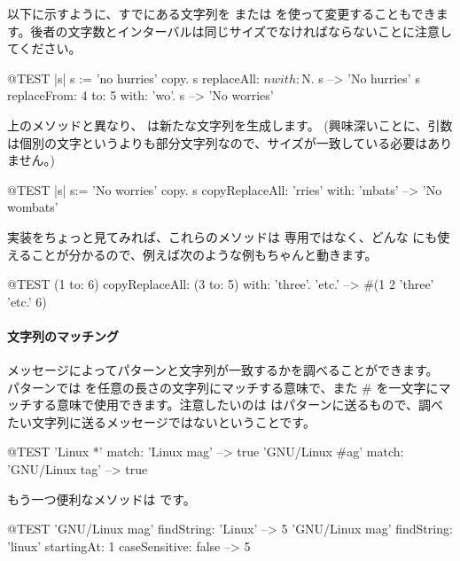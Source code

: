 \documentclass[a4paper,10pt,twoside]{book}
\begin{document}
以下に示すように、すでにある文字列を  または  を使って変更することもできます。後者の文字数とインターバルは同じサイズでなければならないことに注意してください。

\begin{code}{@TEST |s| s := 'no hurries' copy.}
s replaceAll: $n with: $N.
s --> 'No hurries'
s replaceFrom: 4 to: 5 with: 'wo'.
s --> 'No worries'
\end{code}

上のメソッドと異なり、 は新たな文字列を生成します。
(興味深いことに、引数は個別の文字というよりも部分文字列なので、サイズが一致している必要はありません。)

\begin{code}{@TEST |s| s:= 'No worries' copy.}
s copyReplaceAll: 'rries' with: 'mbats' --> 'No wombats'
\end{code}

実装をちょっと見てみれば、これらのメソッドは  専用ではなく、どんな  にも使えることが分かるので、例えば次のような例もちゃんと動きます。

\begin{code}{@TEST}
(1 to: 6) copyReplaceAll: (3 to: 5) with: { 'three'. 'etc.' } --> #(1 2 'three' 'etc.' 6)
\end{code}

\paragraph{文字列のマッチング}
 メッセージによってパターンと文字列が一致するかを調べることができます。
パターンでは \ct{*} を任意の長さの文字列にマッチする意味で、また \# を一文字にマッチする意味で使用できます。注意したいのは  はパターンに送るもので、調べたい文字列に送るメッセージではないということです。
\begin{code}{@TEST}
'Linux *' match: 'Linux mag'                      --> true
'GNU/Linux #ag' match: 'GNU/Linux tag' --> true
\end{code}

もう一つ便利なメソッドは  です。
\begin{code}{@TEST}
'GNU/Linux mag' findString: 'Linux'                                                      --> 5
'GNU/Linux mag' findString: 'linux' startingAt: 1 caseSensitive: false  --> 5
\end{code}
\end{document}
